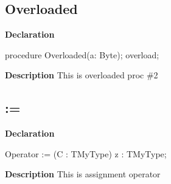 \documentclass{report}
\begin{document}
\subsection*{Overloaded}
\begin{list}{}{
\setlength{\itemindent}{0cm}
\setlength{\listparindent}{0cm}
\setlength{\leftmargin}{\evensidemargin}
\addtolength{\leftmargin}{\tmplength}
\settowidth{\labelsep}{X}
\addtolength{\leftmargin}{\labelsep}
\setlength{\labelwidth}{\tmplength}
}
\begin{flushleft}
\item[\textbf{Declaration}\hfill]
\begin{ttfamily}
procedure Overloaded(a: Byte); overload;\end{ttfamily}


\end{flushleft}
\par
\item[\textbf{Description}]
This is overloaded proc {\#}2

\end{list}
\subsection*{:=}
\begin{list}{}{
\setlength{\itemindent}{0cm}
\setlength{\listparindent}{0cm}
\setlength{\leftmargin}{\evensidemargin}
\addtolength{\leftmargin}{\tmplength}
\settowidth{\labelsep}{X}
\addtolength{\leftmargin}{\labelsep}
\setlength{\labelwidth}{\tmplength}
}
\begin{flushleft}
\item[\textbf{Declaration}\hfill]
\begin{ttfamily}
Operator := (C : TMyType) z : TMyType;\end{ttfamily}


\end{flushleft}
\par
\item[\textbf{Description}]
This is assignment operator

\end{list}
\end{document}
